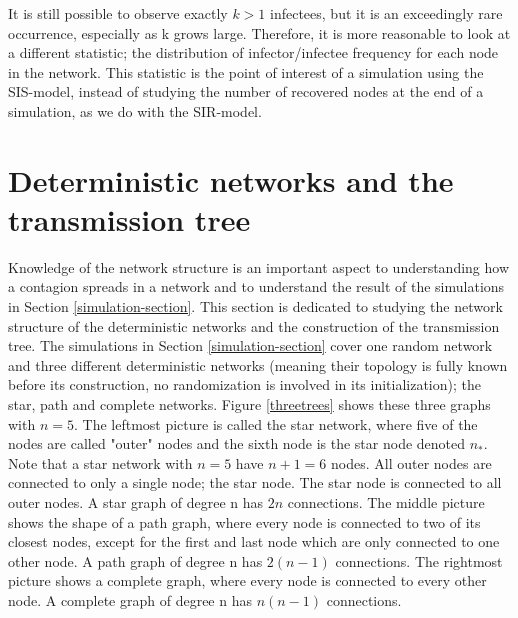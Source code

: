 \documentclass[12pt]{article} %
\numberwithin{equation}{section}
\begin{document}
It is still possible to observe exactly $k>1$ infectees, but it is an exceedingly rare occurrence, especially as k grows large. Therefore, it is more reasonable to look at a different statistic; the distribution of infector/infectee frequency for each node in the network. This statistic is the point of interest of a simulation using the SIS-model, instead of studying the number of recovered nodes at the end of a simulation, as we do with the SIR-model.

\section{Deterministic networks and the transmission tree}\label{tree-section}
Knowledge of the network structure is an important aspect to understanding how a contagion spreads in a network and to understand the result of the simulations in Section \ref{simulation-section}. This section is dedicated to studying the network structure of the deterministic networks and the construction of the transmission tree. The simulations in Section \ref{simulation-section} cover one random network and three different deterministic networks (meaning their topology is fully known before its construction, no randomization is involved in its initialization); the star, path and complete networks. Figure \ref{threetrees} shows these three graphs with $n=5$. The leftmost picture is called the star network, where five of the nodes are called "outer" nodes and the sixth node is the star node denoted $n_*$. Note that a star network with $n=5$ have $n+1=6$ nodes. All outer nodes are connected to only a single node; the star node. The star node is connected to all outer nodes. A star graph of degree n has $2n$ connections. The middle picture shows the shape of a path graph, where every node is connected to two of its closest nodes, except for the first and last node which are only connected to one other node. A path graph of degree n has $2(n-1)$ connections. The rightmost picture shows a complete graph, where every node is connected to every other node. A complete graph of degree n has $n(n-1)$ connections.
\end{document}
